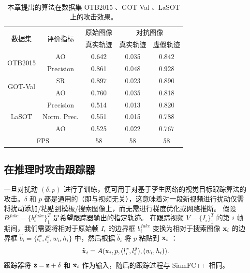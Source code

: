 \begin{table}[t]
\centering
\caption{本章提出的算法在数据集 OTB2015 \cite{OTB2015}、GOT-Val \cite{GOT-10k}、LaSOT \cite{LaSOT} 上的攻击效果。}
\begin{tabular}{c c c c c}
\toprule
\multirow{2}{*}[-2pt]{数据集} & \multirow{2}{*}[-2pt]{评价指标} & 原始图像 & \multicolumn{2}{c}{对抗图像}  \\
\cmidrule(lr){3-3} \cmidrule(lr){4-5}
                          &                         & 真实轨迹 & 真实轨迹 & 虚假轨迹     \\ 
\midrule
\multirow{2}{*}{OTB2015 \cite{OTB2015}} 
& AO   & 0.642 & 0.035 & 0.842\\
& Precision & 0.861 & 0.048 & 0.928\\
\midrule
\multirow{2}{*}{GOT-Val \cite{GOT-10k}} 
& SR & 0.897 & 0.023 & 0.890\\
& AO 				   & 0.760 & 0.035 & 0.818 \\
\midrule
\multirow{3}{*}{LaSOT \cite{LaSOT}} 
& Precision       & 0.514 & 0.013 & 0.820\\
& Norm. Prec. & 0.551 & 0.015 & 0.788\\
& AO & 0.525 & 0.022 & 0.767\\
\midrule
\multicolumn{2}{c}{FPS} & 58 & 58 & 58\\
\bottomrule
\end{tabular}
\label{tab:attack_benchmark results}
\end{table}

\subsection{在推理时攻击跟踪器}

一旦对扰动 $(\delta, p)$ 进行了训练，便可用于对基于孪生网络的视觉目标跟踪算法的攻击。$\delta$ 和 $p$ 都是通用的（即与视频无关），这意味着对一段新视频进行扰动仅需将扰动添加/粘贴到模板/搜索图像上，而无需进行梯度优化或网络推断。
假设 $B^{fake}=\{b^{fake}_i\}_1^{T}$ 是希望跟踪器输出的指定轨迹。
在跟踪视频 $V=\{I_i\}_1^T$ 的第 $i$ 帧期间，我们需要将相对于原始帧 $I_i$ 的边界框 $b^{fake}_i$ 变换为相对于搜索图像 $\textbf x_i$ 的边界框 $\hat b_i=\{l^x_i, l^y_i, w_i, h_i\}$ 中，然后根据 $\hat b_i$ 将 $p$ 粘贴到 $\textbf x_i$ ：
\begin{equation}
\tilde{\textbf x}_i = A(\textbf x_i, p, (l^x_i, l^y_i), (w_i, h_i)).
\end{equation}
跟踪器将 $\tilde{\textbf z}=\textbf z+\delta$ 和 $\tilde{\textbf x}_i$ 作为输入，随后的跟踪过程与 SiamFC++ 相同。

